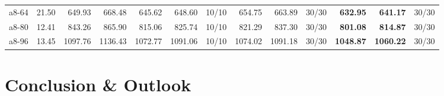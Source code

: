 \documentclass[aspectratio=1610]{beamer}
\begin{document}
\begin{frame}
\begin{table}[]
{\begin{tabular}{lrrrrrrrrrrrr}
a8-64                                          & 21.50                                                        & 649.93  & \multicolumn{1}{r|}{668.48}   & 645.62  & 648.60   & \multicolumn{1}{r|}{10/10} & 654.75  & 663.89   & \multicolumn{1}{r|}{30/30} & \textbf{632.95}  & {\color[HTML]{FE0000} \textbf{641.17}}  & 30/30 \\
a8-80                                          & 12.41                                                        & 843.26  & \multicolumn{1}{r|}{865.90}   & 815.06  & 825.74   & \multicolumn{1}{r|}{10/10} & 821.29  & 837.30   & \multicolumn{1}{r|}{30/30} & \textbf{801.08}  & {\color[HTML]{FE0000} \textbf{814.87}}  & 30/30 \\
a8-96                                          & 13.45                                                        & 1097.76 & \multicolumn{1}{r|}{1136.43}  & 1072.77 & 1091.06  & \multicolumn{1}{r|}{10/10} & 1074.02 & 1091.18  & \multicolumn{1}{r|}{30/30} & \textbf{1048.87} & {\color[HTML]{FE0000} \textbf{1060.22}} & 30/30 \\ \hline
\end{tabular}%
}
\end{table}
\end{frame}


\section{Conclusion \& Outlook}
\end{document}
